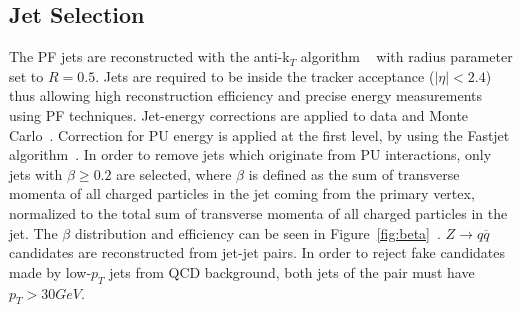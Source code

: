 \subsection{Jet Selection}
\label{sec:jetsel}
The PF jets are reconstructed with the anti-k$_{T}$ algorithm ~\cite{antikt} with radius parameter set to $R=0.5$. Jets are required to be inside the tracker acceptance ($|\eta|<2.4$) thus allowing high reconstruction efficiency and precise energy measurements using PF techniques. Jet-energy corrections are applied to data and Monte Carlo~\cite{CMS-PAS-JME-10-010}. Correction for PU energy is applied at the first level, by using the Fastjet algorithm~\cite{FastJet}. In order to remove jets which originate from PU interactions, only jets with $\beta \ge 0.2$ are selected, where $\beta$ is defined as the sum of transverse momenta of all charged particles in the jet coming from the primary vertex, normalized to the total sum of transverse momenta of all charged particles in the jet. The $\beta$ distribution and efficiency can be seen in Figure~\ref{fig:beta}~\cite{2l2q115}. $Z \rightarrow q\overline{q} $ candidates are reconstructed from jet-jet pairs. In order to reject fake candidates made by low-$p_T$ jets from QCD background, both jets of the pair must have $p_T > 30 GeV$.


